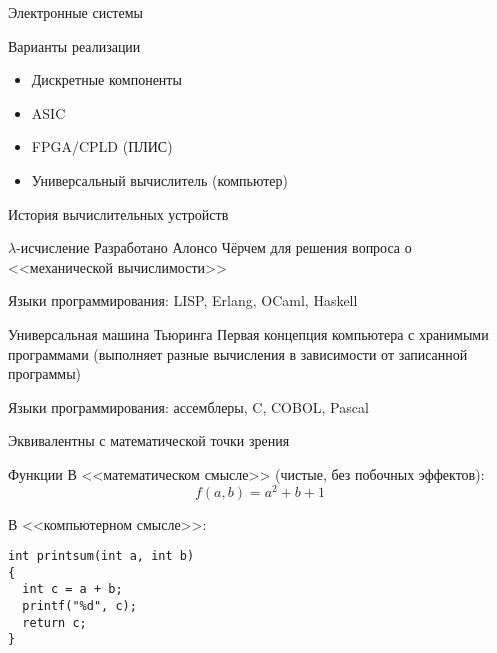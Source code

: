 \documentclass[t]{beamer}
\begin{document}
\begin{frame}{Электронные системы}
  \begin{block}{Варианты реализации}
  \begin{itemize}
  \item Дискретные компоненты
  \item ASIC
  \item FPGA/CPLD (ПЛИС)
  \item Универсальный вычислитель (компьютер)
  \end{itemize}
  \end{block}
\end{frame}

\begin{frame}{История вычислительных устройств}
  \begin{block}{$\lambda$-исчисление}
    Разработано Алонсо Чёрчем для решения вопроса о <<механической
    вычислимости>>

    Языки программирования: LISP, Erlang, OCaml, Haskell
  \end{block}
  \begin{block}{Универсальная машина Тьюринга}
    Первая концепция компьютера с хранимыми программами (выполняет
    разные вычисления в зависимости от записанной программы)

    Языки программирования: ассемблеры, C, COBOL, Pascal
  \end{block}

  \begin{block}{}
    \begin{center}
      Эквивалентны с математической точки зрения
    \end{center}
  \end{block}
\end{frame}

\begin{frame}[fragile]{Функции}
В <<математическом смысле>> (чистые, без побочных эффектов):
$$
f(a,b) = a^2 + b + 1
$$

В <<компьютерном смысле>>:
\begin{lstlisting}
int printsum(int a, int b)
{
  int c = a + b;
  printf("%d", c);
  return c;
}
\end{lstlisting}
\end{frame}
\end{document}
